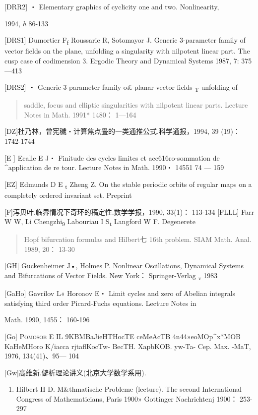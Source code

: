 \documentclass{article}
\begin{document}
{[}DRR2{]} ・ Elementary graphics of cyclicity one and two.
Nonlinearity,

1994, \emph{h} 86-133

{[}DRS1{]} Dumortier F\textsubscript{f} Roussarie R, Sotomayor J.
Generic 3-parameter family of vector fields on the plane, unfolding a
singularity with nilpotent linear part. The cusp case of codimension 3.
Ergodic Theory and Dy­namical Systems 1987, 7: 375---413

{[}DRS2{]} ・ Generic 3-parameter family o£ planar vector fields
\textsubscript{T} unfolding of

\begin{quote}
saddle, focus and elliptic singularities with nilpotent linear parts.
Lec­ture Notes in Math. 1991* 1480： 1---164
\end{quote}

{[}DZ{]}杜乃林，曾宪穢・计算焦点畳的一类通推公式.科学通报，1994, 39
(19)： 1742-1744

{[}E {]} Ecalle E J・ Finitude des cycles limites et acc616ro-sommation
de \^{}application de re tour. Lecture Notes in Math. 1990・ 14551 74
--- 159

{[}EZ{]} Edmunds D E \textsubscript{t} Zheng Z. On the stable periodic
orbits of regular maps on a completely ordered invariant set. Preprint

{[}F{]}泻贝叶.临界情况下奇环的稿定性.数学学报，1990, 33(1)： 113-134
{[}FLLL{]} Farr W W, Li Chengzhi\textsubscript{9} Labouriau I
S\textsubscript{t} Langford W F. Degenerete

\begin{quote}
Hopf bifurcation formulas and Hilbert七 16th problem. SIAM Math. Anal.
1989, 20： 13-30
\end{quote}

{[}GH{]} Guckenheimer J•, Holmes P. Nonlinear Oscillations, Dynamical
Systems and Bifurcations of Vector Fields. New York： Springer-Verlag
\textsubscript{v} 1983

{[}GaHo{]} Gavrilov L« Horoaov E・ Limit cycles and zero of Abelian
integrals satisfying third order Picard-Fuchs equations. Lecture Notes
in

Math. 1990, 1455： 160-196

{[}Go{]} \textsc{Pomosob} E IL 9KBMBaJieHTHocTE ceMeAcTB
4n44»eoMOp\^{}x*MOB KaHeMHoro K/iacca rjtaflKocTw- BecTH. XapbKOB.
yw-Ta- Cep. Max. -MaT, 1976, 134(41)、95--- 104

{[}Gw{]}高维新.僻析理论讲义(北京大学数学系用).

\begin{enumerate}
\def\labelenumi{\Alph{enumi}.}
\setcounter{enumi}{7}
\item
  Hilbert H D. M\&thmatische Probleme (lecture). The second
  Internation­al Congress of Mathematicians, Paris 1900» Gottinger
  Nachrichtenj 1900： 253-297
\end{enumerate}
\end{document}
